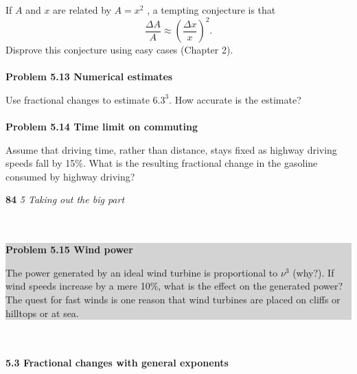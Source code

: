 \documentclass{book}
\begin{document}
{{\begin{minipage}{\textwidth}
{If $A$ and $x$ are related by $A=x^{2}$ , a tempting conjecture is that}
\begin{equation}
\frac{\Delta A}{A} \approx (\frac{\Delta x}{x})^{2}.
\end{equation}
Disprove this conjecture using easy cases (Chapter 2).
\\
\\
\textbf{Problem 5.13 Numerical estimates }

Use fractional changes to estimate $6.3^{3}$. How accurate is the estimate?
\\
\\
\textbf{Problem 5.14 Time limit on commuting }

Assume that driving time, rather than distance, stays fixed as highway driving
speeds fall by 15\%. What is the resulting fractional change in the gasoline consumed
by highway driving?
\end{minipage}
}
\newpage
 \large\textbf{84} \hfill \textit{5 Taking out the big part} \\ 
\vspace{0pt} 
\\
\\
\colorbox{lightgray}{
\begin{minipage}{\textwidth}
 {\textbf{Problem 5.15 Wind power}
 
The power generated by an ideal wind turbine is proportional to $\nu^{3}$ (why?). If
wind speeds increase by a mere 10\%, what is the effect on the generated power?
The quest for fast winds is one reason that wind turbines are placed on cliffs or
hilltops or at sea.}
\end {minipage}
}
\\
\\

\textbf{5.3 Fractional changes with general exponents}
\\

}
\end{document}
